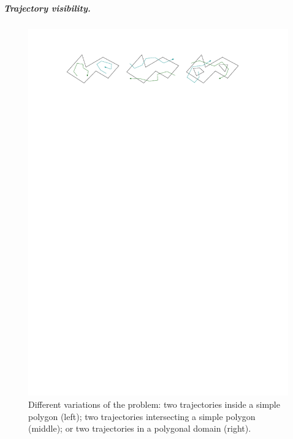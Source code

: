 \documentclass[UKenglish]{lipics-v2019}
\begin{document}
\subparagraph {Trajectory visibility.}


\begin{figure} [b]
	\centering \includegraphics {variants} 
	\caption
	{
	  Different variations of the problem:
	  two trajectories inside a simple polygon (left);
	  two trajectories intersecting a simple polygon (middle);
	  or two trajectories in a polygonal domain (right).
	}  
	\addtolength{\belowcaptionskip}{-50pt}
	\label{fig:variants}
\end{figure}
\end{document}
